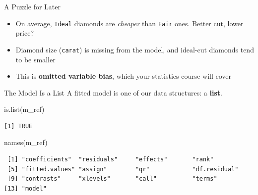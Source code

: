 \documentclass[
  ignorenonframetext,
  aspectratio=169,
]{beamer}
\newenvironment{Shaded}{\begin{snugshade}}{\end{snugshade}}
\newcommand{\FunctionTok}[1]{\textcolor[rgb]{0.28,0.35,0.67}{#1}}
\newcommand{\NormalTok}[1]{\textcolor[rgb]{0.00,0.23,0.31}{#1}}
\newcommand{\SpecialCharTok}[1]{\textcolor[rgb]{0.37,0.37,0.37}{#1}}
\providecommand{\tightlist}{%
  \setlength{\itemsep}{0pt}\setlength{\parskip}{0pt}}\usepackage{longtable,booktabs,array}
\begin{document}
\begin{frame}[fragile]{A Puzzle for Later}
\protect\hypertarget{a-puzzle-for-later}{}
\begin{itemize}
\tightlist
\item
  On average, \texttt{Ideal} diamonds are \emph{cheaper} than
  \texttt{Fair} ones. Better cut, lower price?
\item
  Diamond size (\texttt{carat}) is missing from the model, and ideal-cut
  diamonds tend to be smaller
\item
  This is \textbf{omitted variable bias}, which your statistics course
  will cover
\end{itemize}
\end{frame}

\begin{frame}[fragile]{The Model Is a List}
\protect\hypertarget{the-model-is-a-list}{}
A fitted model is one of our data structures: a \textbf{list}.

\begin{Shaded}
\begin{Highlighting}[]
\FunctionTok{is.list}\NormalTok{(m\_ref)}
\end{Highlighting}
\end{Shaded}

\begingroup\tiny\color{darkgray}

\begin{verbatim}
[1] TRUE
\end{verbatim}

\endgroup

\begin{Shaded}
\begin{Highlighting}[]
\FunctionTok{names}\NormalTok{(m\_ref)}
\end{Highlighting}
\end{Shaded}

\begingroup\tiny\color{darkgray}

\begin{verbatim}
 [1] "coefficients"  "residuals"     "effects"       "rank"         
 [5] "fitted.values" "assign"        "qr"            "df.residual"  
 [9] "contrasts"     "xlevels"       "call"          "terms"        
[13] "model"        
\end{verbatim}

\endgroup

\begin{Shaded}
\end{Shaded}


\end{frame}
\end{document}
